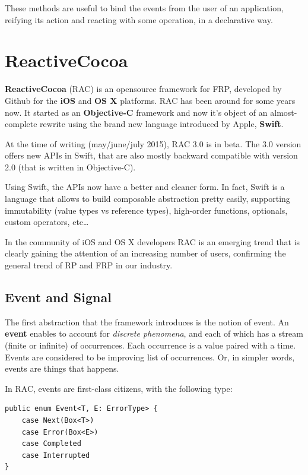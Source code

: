 These methods are useful to bind the events from the user of an
application, reifying its action and reacting with some operation, in a
declarative way.

\section{ReactiveCocoa}\label{reactivecocoa}

\textbf{ReactiveCocoa} (RAC) is an opensource framework for FRP,
developed by Github for the \textbf{iOS} and \textbf{OS X} platforms.
RAC has been around for some years now. It started as an
\textbf{Objective-C} framework and now it's object of an almost-complete
rewrite using the brand new language introduced by Apple,
\textbf{Swift}.

At the time of writing (may/june/july 2015), RAC 3.0 is in beta. The 3.0
version offers new APIs in Swift, that are also mostly backward
compatible with version 2.0 (that is written in Objective-C).

Using Swift, the APIs now have a better and cleaner form. In fact, Swift
is a language that allows to build composable abstraction pretty easily,
supporting immutability (value types vs reference types), high-order
functions, optionals, custom operators, etc\ldots{}

In the community of iOS and OS X developers RAC is an emerging trend
that is clearly gaining the attention of an increasing number of users,
confirming the general trend of RP and FRP in our industry.


\subsection{Event and Signal}\label{event-and-signal}

The first abstraction that the framework introduces is the notion of
event. An \textbf{event} enables to account for \emph{discrete
phenomena}, and each of which has a stream (finite or infinite) of
occurrences. Each occurrence is a value paired with a time.
Events are considered to be improving list of occurrences. Or, in simpler
words, events are things that happens.

In RAC, events are first-class citizens, with the following type:

\begin{verbatim}
public enum Event<T, E: ErrorType> {
    case Next(Box<T>)
    case Error(Box<E>)
    case Completed
    case Interrupted
}
\end{verbatim}

